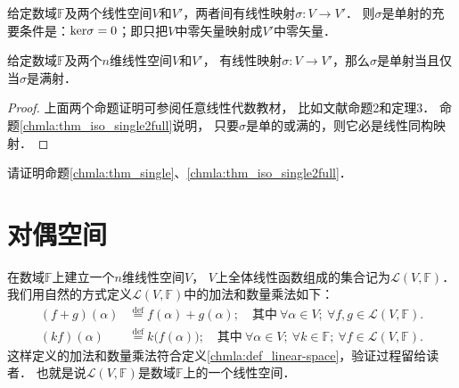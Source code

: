 \begin{proposition}\label{chmla:thm_single}
    给定数域$\mathbb{F}$及两个线性空间$V$和$V'$，两者间有线性映射$\sigma:V\to V'$．
    则$\sigma$是单射的充要条件是：${\rm ker}\sigma = 0$；即只把$V$中零矢量映射成$V'$中零矢量．
\end{proposition}
\begin{proposition}\label{chmla:thm_iso_single2full}
    给定数域$\mathbb{F}$及两个$n$维线性空间$V$和$V'$，
    有线性映射$\sigma:V\to V'$，那么$\sigma$是单射当且仅当$\sigma$是满射．
\end{proposition}

\begin{proof}
    上面两个命题证明可参阅任意线性代数教材，
    比如文献\parencite[\S 9.2]{qiuws-2019-v2}命题2和定理3．
    命题\ref{chmla:thm_iso_single2full}说明，
    只要$\sigma$是单的或满的，则它必是线性同构映射．
\end{proof}

\begin{exercise}
	请证明命题\ref{chmla:thm_single}、\ref{chmla:thm_iso_single2full}．
\end{exercise}


\section{对偶空间}\label{chmla:sec_dual}

在数域$\mathbb{F}$上建立一个$n$维线性空间$V$，
$V$上全体线性函数组成的集合记为$\mathscr{L}(V,\mathbb{F})$．
我们用自然的方式定义$\mathscr{L}(V,\mathbb{F})$中的加法和数量乘法如下：
\begin{subequations}\label{chmla:eqn_dual-pp}
\begin{align}
    (f+g)(\alpha)  &\overset{\mathrm {def}}{=}  f(\alpha)+g(\alpha); \quad
    \text{其中}\ \forall \alpha \in V; \ \forall f,g \in \mathscr{L}(V,\mathbb{F}) .  \\
    (k f) (\alpha) &\overset{\mathrm {def}}{=}  k \bigl( f(\alpha)\bigr); \quad
    \text{其中}\ \forall \alpha \in V;\ \forall k \in \mathbb{F}; \
    \forall f \in \mathscr{L}(V,\mathbb{F}) .
\end{align}
\end{subequations}
这样定义的加法和数量乘法符合定义\ref{chmla:def_linear-space}，验证过程留给读者．
也就是说$\mathscr{L}(V,\mathbb{F})$是数域$\mathbb{F}$上的一个线性空间．

